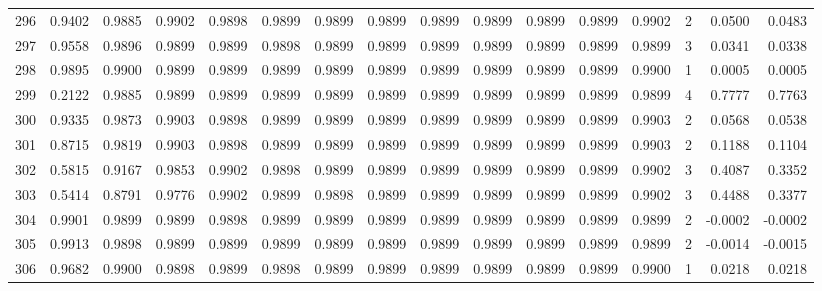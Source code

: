 \begin{tabular}{lrrrrrrrrrrrrrrr}
296 &      0.9402 &  0.9885 &  0.9902 &  0.9898 &  0.9899 &  0.9899 &  0.9899 &  0.9899 &  0.9899 &  0.9899 &   0.9899 &     0.9902 &      2 &                    0.0500 &                     0.0483 \\
297 &      0.9558 &  0.9896 &  0.9899 &  0.9899 &  0.9898 &  0.9899 &  0.9899 &  0.9899 &  0.9899 &  0.9899 &   0.9899 &     0.9899 &      3 &                    0.0341 &                     0.0338 \\
298 &      0.9895 &  0.9900 &  0.9899 &  0.9899 &  0.9899 &  0.9899 &  0.9899 &  0.9899 &  0.9899 &  0.9899 &   0.9899 &     0.9900 &      1 &                    0.0005 &                     0.0005 \\
299 &      0.2122 &  0.9885 &  0.9899 &  0.9899 &  0.9899 &  0.9899 &  0.9899 &  0.9899 &  0.9899 &  0.9899 &   0.9899 &     0.9899 &      4 &                    0.7777 &                     0.7763 \\
300 &      0.9335 &  0.9873 &  0.9903 &  0.9898 &  0.9899 &  0.9899 &  0.9899 &  0.9899 &  0.9899 &  0.9899 &   0.9899 &     0.9903 &      2 &                    0.0568 &                     0.0538 \\
301 &      0.8715 &  0.9819 &  0.9903 &  0.9898 &  0.9899 &  0.9899 &  0.9899 &  0.9899 &  0.9899 &  0.9899 &   0.9899 &     0.9903 &      2 &                    0.1188 &                     0.1104 \\
302 &      0.5815 &  0.9167 &  0.9853 &  0.9902 &  0.9898 &  0.9899 &  0.9899 &  0.9899 &  0.9899 &  0.9899 &   0.9899 &     0.9902 &      3 &                    0.4087 &                     0.3352 \\
303 &      0.5414 &  0.8791 &  0.9776 &  0.9902 &  0.9899 &  0.9898 &  0.9899 &  0.9899 &  0.9899 &  0.9899 &   0.9899 &     0.9902 &      3 &                    0.4488 &                     0.3377 \\
304 &      0.9901 &  0.9899 &  0.9899 &  0.9898 &  0.9899 &  0.9899 &  0.9899 &  0.9899 &  0.9899 &  0.9899 &   0.9899 &     0.9899 &      2 &                   -0.0002 &                    -0.0002 \\
305 &      0.9913 &  0.9898 &  0.9899 &  0.9899 &  0.9899 &  0.9899 &  0.9899 &  0.9899 &  0.9899 &  0.9899 &   0.9899 &     0.9899 &      2 &                   -0.0014 &                    -0.0015 \\
306 &      0.9682 &  0.9900 &  0.9898 &  0.9899 &  0.9898 &  0.9899 &  0.9899 &  0.9899 &  0.9899 &  0.9899 &   0.9899 &     0.9900 &      1 &                    0.0218 &                     0.0218 \\

\end{tabular}
